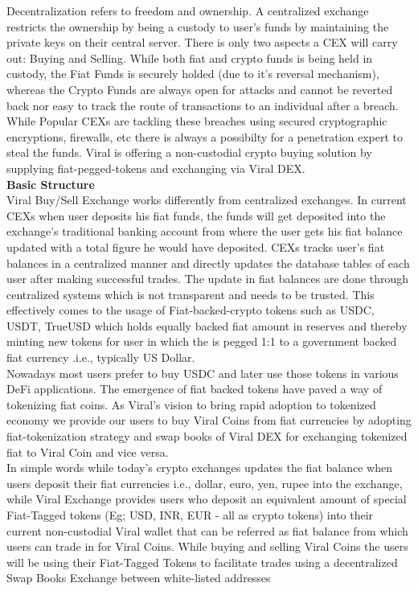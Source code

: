 \documentclass[10pt]{article}
\begin{document}
Decentralization refers to freedom and ownership. A centralized exchange restricts the ownership by being a custody to user's funds by maintaining the private keys on their central server. There is only two aspects a CEX will carry out: Buying and Selling. While both fiat and crypto funds is being held in custody, the Fiat Funds is securely holded (due to it's reversal mechanism), whereas the Crypto Funds are always open for attacks and cannot be reverted back nor easy to track the route of transactions to an individual after a breach. While Popular CEXs are tackling these breaches using secured cryptographic encryptions, firewalls, etc there is always a possibilty for a penetration expert to steal the funds. Viral is offering a non-custodial crypto buying solution by supplying fiat-pegged-tokens and exchanging via Viral DEX.\\

\textbf{Basic Structure}\\

Viral Buy/Sell Exchange works differently from centralized exchanges. In current CEXs when user deposits his fiat funds, the funds will get deposited into the exchange's traditional banking account from where the user gets his fiat balance updated with a total figure he would have deposited. CEXs tracks user's fiat balances in a centralized manner and directly updates the database tables of each user after making successful trades. The update in fiat balances are done through centralized systems which is not transparent and needs to be trusted. This effectively comes to the usage of Fiat-backed-crypto tokens such as USDC, USDT, TrueUSD which holds equally backed fiat amount in reserves and thereby minting new tokens for user in which the is pegged 1:1 to a government backed fiat currency .i.e., typically US Dollar.\\

Nowadays most users prefer to buy USDC and later use those tokens in various DeFi applications. The emergence of fiat backed tokens have paved a way of tokenizing fiat coins. As Viral's vision to bring rapid adoption to tokenized economy we provide our users to buy Viral Coins from fiat currencies by adopting fiat-tokenization strategy and swap books of Viral DEX for exchanging tokenized fiat to Viral Coin and vice versa.\\

In simple words while today's crypto exchanges updates the fiat balance when users deposit their fiat currencies i.e., dollar, euro, yen, rupee into the exchange, while Viral Exchange provides users who deposit an equivalent amount of special Fiat-Tagged tokens (Eg; USD, INR, EUR - all as crypto tokens) into their current non-custodial Viral wallet that can be referred as fiat balance from which users can trade in for Viral Coins. While buying and selling Viral Coins the users will be using their Fiat-Tagged Tokens to facilitate trades using a decentralized Swap Books Exchange between white-listed addresses\\
\end{document}
